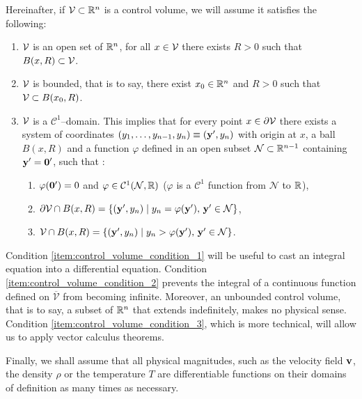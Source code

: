 \noindent
Hereinafter, if $\mathcal{V}_{} \subset \mathbb{R}^n$ is a control volume, we will assume it satisfies the following:
\begin{enumerate}[label={(\roman*)}, topsep=0pt]
	\item $\mathcal{V}_{}$ is an open set of $\mathbb{R}^n$, \ie for all $x \in \mathcal{V}_{}$
	there exists $R > 0$ such that $B(x, R) \subset \mathcal{V}_{}$.
	\label{item:control_volume_condition_1}
	\item $\mathcal{V}_{}$ is bounded, that is to say, there exist $x_0 \in \mathbb{R}^n$
	and $R > 0$ such that $\mathcal{V}_{} \subset B(x_0, R)$.
	\label{item:control_volume_condition_2}
	\item $\mathcal{V}_{}$ is a $\mathcal{C}^1$--domain. This implies that for every
	point $x \in \partial \mathcal{V}_{}$ there exists a system of coordinates
	$(y_1, \ldots, y_{n-1}, y_n) \equiv (\vb{y'}, y_n)$ with origin at $x$,
	a ball $B(x, R)$ and a function $\varphi$ defined in an open subset
	$\mathcal{N} \subset \mathbb{R}^{n-1}$ containing $\vb{y'} = \vb{0}'$, such that
	\cite{salsa2009chap1}: \label{item:control_volume_condition_3}
	\begin{enumerate}[topsep=0pt]
		\item $\varphi(\vb{0'}) = 0$ and $\varphi \in \mathcal{C}^1(\mathcal{N},
		\mathbb{R})$ ($\varphi$ is a $\mathcal{C}^1$ function from $\mathcal{N}$ to
		$\mathbb{R}$),
		\item $\partial \mathcal{V}_{} \cap B(x, R) = \{ (\vb{y'}, y_n) \mid y_n =
		\varphi(\vb{y'}), \, \vb{y'} \in \mathcal{N} \}$,
		\item $\mathcal{V}_{} \cap B(x, R) = \{ (\vb{y'}, y_n) \mid y_n >
		\varphi(\vb{y'}), \, \vb{y'} \in \mathcal{N} \}$.
	\end{enumerate} 
\end{enumerate}
Condition \ref{item:control_volume_condition_1} will be useful to cast an
integral equation into a differential equation. Condition
\ref{item:control_volume_condition_2} prevents the integral of a continuous
function defined on $\overline{\mathcal{V}}$ from becoming infinite. Moreover,
an unbounded control volume, that is to say, a subset of $\mathbb{R}^n$ that extends
indefinitely, makes no physical sense. Condition
\ref{item:control_volume_condition_3}, which is more technical, will allow us to
apply vector calculus theorems.

Finally, we shall assume that all physical magnitudes, such as the velocity
field $\vb{v}$, the density $\rho$ or the temperature $T$ are differentiable
functions on their domains of definition as many times as necessary.




